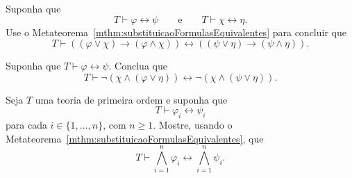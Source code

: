 \begin{exercise}
    Suponha que
    \[
        T\vdash \varphi\leftrightarrow\psi
        \qquad\text{e}\qquad
        T\vdash \chi\leftrightarrow\eta.
    \]
    Use o Metateorema~\ref{mthm:substituicaoFormulasEquivalentes} para concluir que
    \[
        T\vdash
        ((\varphi\vee\chi)\rightarrow(\varphi\wedge\chi))
        \leftrightarrow
        ((\psi\vee\eta)\rightarrow(\psi\wedge\eta)).
    \]
\end{exercise}

\begin{exercise}
    Suponha que $T\vdash \varphi\leftrightarrow\psi$.
    Conclua que
    \[
        T\vdash
        \neg(\chi\wedge(\varphi\vee\eta))
        \leftrightarrow
        \neg(\chi\wedge(\psi\vee\eta)).
    \]
\end{exercise}

\begin{exercise}
    Seja $T$ uma teoria de primeira ordem e suponha que
    \[
        T\vdash \varphi_i\leftrightarrow\psi_i
    \]
    para cada $i\in\{1,\dots,n\}$, com $n\geq 1$.
    Mostre, usando o Metateorema~\ref{mthm:substituicaoFormulasEquivalentes}, que
    \[
        T\vdash
        \bigwedge_{i=1}^n\varphi_i
        \leftrightarrow
        \bigwedge_{i=1}^n\psi_i.
    \]
\end{exercise}

